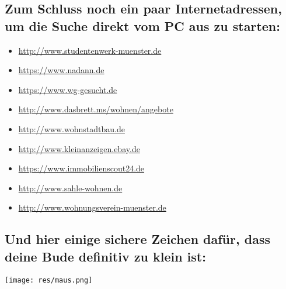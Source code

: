 \begin{multicols*}{2}
\subsection*{Zum Schluss noch ein paar Internetadressen, um die Suche direkt vom PC aus zu starten:}
\begin{itemize}[leftmargin=0.8cm]
\item \url{http://www.studentenwerk-muenster.de}
\item \url{https://www.nadann.de}
\item \url{https://www.wg-gesucht.de}
\item \url{http://www.dasbrett.ms/wohnen/angebote}
\item \url{http://www.wohnstadtbau.de}
\item \url{http://www.kleinanzeigen.ebay.de}
\item \url{https://www.immobilienscout24.de}
\item \url{http://www.sahle-wohnen.de}
\item \url{http://www.wohnungsverein-muenster.de}
\end{itemize}

\subsection*{Und hier einige sichere Zeichen dafür, dass deine Bude definitiv zu klein ist:}
\hspace{1.5cm}\texttt{[image: res/maus.png]}

\vspace{-\parskip}\vspace{-0.1cm}
\setlength{\fboxsep}{0.2cm}

\end{multicols*}

